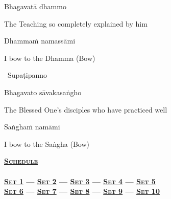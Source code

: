 \vspace{-0.5cm}

Bhagavatā dhammo

\begin{english}
  The Teaching so completely explained by him
\end{english}

Dhammaṁ namassāmi

\begin{english}
  I bow to the Dhamma \hfill{(Bow)}
\end{english}

\begin{leader}
  \anglebracketleft\ \hspace{-0.5mm}Supaṭipanno \hspace{-0.5mm}\anglebracketright\
\end{leader}

\vspace{-0.5cm}

Bhagavato sāvakasaṅgho

\begin{english}
  The Blessed One's disciples who have practiced well
\end{english}

Saṅghaṁ namāmi

\begin{english}
  I bow to the Saṅgha \hfill{(Bow)}\\
\end{english}

\null
\vfill

\ifdesktopversion
\begin{minipage}[b][25pt][c]{\linewidth}
  \begin{leader}
    \textbf{\vspace{0.2em}\textsc{\hyperref[schedule]{Schedule}\\
        {\centering{}}\\
        \vspace{0.8em}
        \hyperref[buddhas-first-exclamation]{Set 1} \hspace{0.02cm} — \hspace{0.02cm} \hyperref[characteristic-of-not-self]{Set 2} \hspace{0.02cm} — \hspace{0.02cm} \hyperref[noble-eightfold-path]{Set 3} \hspace{0.02cm} — \hspace{0.02cm} \hyperref[dedication-of-offerings]{Set 4} \hspace{0.02cm} — \hspace{0.02cm} \hyperref[mindfulness-of-breathing]{Set 5}\\
        \vspace{0.5em}
        \hyperref[anatta-lakkhana]{Set 6} — \hyperref[dependent-origination]{Set 7} — \hyperref[aditta-pariyaya]{Set 8} — \hyperref[deva-aradhana]{Set 9} — \hyperref[pubba-bhaga-nama-kara-patho]{Set 10}}}
  \end{leader}
\end{minipage}
\fi
